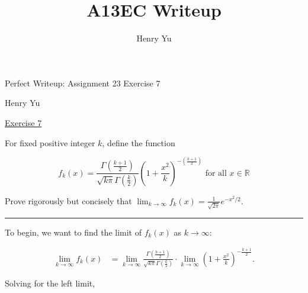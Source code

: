 \documentclass[12pt,a4paper]{article}
\author{Henry Yu}
\title{A13EC Writeup}
\begin{document}
\begin{titlepage}
	
	\begin{center}

		\vspace*{\fill}

    	\vspace*{0.5cm}
	
	    \huge{Perfect Writeup: Assignment 23 Exercise 7}
	
	    \vspace*{0.5cm}
	
	    \large{Henry Yu}
	
    	\vspace*{\fill}

	\end{center}

\end{titlepage}

\raggedright

\underline{Exercise 7}

\bigbreak

For fixed positive integer $k$, define the function

$$
f_{k}(x)=\frac{\Gamma\left(\frac{k+1}{2}\right)}{\sqrt{k \pi} \Gamma\left(\frac{k}{2}\right)}\left(1+\frac{x^{2}}{k}\right)^{-\left(\frac{k+1}{2}\right)} \text { for all } x \in \mathbb{R}
$$

Prove rigorously but concisely that $\lim _{k \rightarrow \infty} f_{k}(x)=\frac{1}{\sqrt{2 \pi}} e^{-x^{2} / 2}$.

\vspace{0.5cm}
\hrule
\vspace{0.5cm}

To begin, we want to find the limit of $f_k(x)$ as $k\rightarrow\infty$:

\begin{align*}
	\lim_{k\rightarrow\infty}f_k(x)&=\lim _{k\rightarrow\infty}\frac{\Gamma(\frac{k+1}{2})}{\sqrt{k\pi}\Gamma(\frac{k}{2})}\cdot\lim_{k\rightarrow\infty}\left(1+\frac{x^2}{k}\right)^{-\frac{k+1}{2}}.
\end{align*}

Solving for the left limit,
\end{document}
